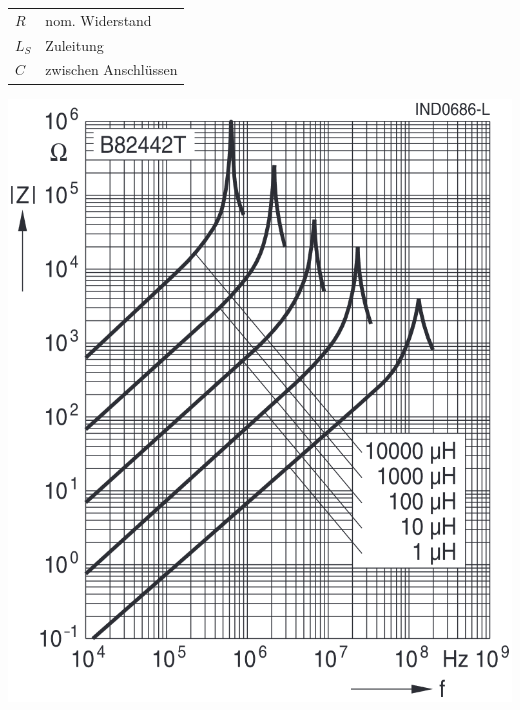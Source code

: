 \begin{minipage}[c]{0.58\columnwidth}
    

    \begin{tabular}{ll}
        $R$     & nom. Widerstand  \\
        $L_S$   & Zuleitung \\
        $C$     & zwischen Anschlüssen
    \end{tabular}
\end{minipage}
\hfill
\begin{minipage}[c]{0.4\columnwidth}
    \includegraphics[width=\columnwidth]{images/reale_spule_frequenzverlauf.png}

\end{minipage}